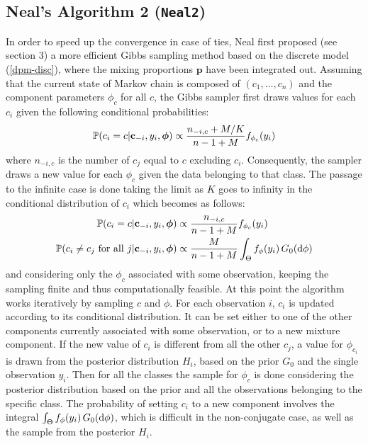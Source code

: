 \subsection{Neal's Algorithm 2 (\texttt{Neal2})}
In order to speed up the convergence in case of ties, Neal first proposed (see \cite{neal} section 3) a more efficient Gibbs sampling method based on the discrete model (\ref{dpm-disc}), where the mixing proportions $\textbf{p}$ have been integrated out.
Assuming that the current state of Markov chain is composed of $(c_1,\dots,c_n)$  and the component parameters $\phi_c$ for all $c$, the Gibbs sampler first draws values for each $c_i$ given the following conditional probabilities:
\begin{align}
			\mathbb P(c_{i}=c | \mathbf c_{-i}, y_{i},\boldsymbol\phi) \propto \frac{n_{-i,c} + M/{K}}{n-1+M} f_{\phi_{c}}(y_{i}) 
\end{align}
where $n_{-i,c}$ is the number of $c_j$ equal to $c$ excluding $c_i$.
Consequently, the sampler draws a new value for each $\phi_c$ given the data belonging to that class.
The passage to the infinite case is done taking the limit as $K$ goes to infinity in the conditional distribution of $c_i$ which becomes as follows:
\begin{align}
	\mathbb P(c_{i}=c | \mathbf c_{-i}, y_{i},\boldsymbol\phi) &\propto \frac{n_{-i,c} }{n-1+M} f_{\phi_{c}}(y_{i}) \\
	\mathbb P(c_{i}\neq c_{j} \text{ for all } j | \mathbf c_{-i}, y_{i},\boldsymbol\phi) &\propto \frac{M }{n-1+M} \int_{\Theta} f_{\phi}(y_{i}) \, G_0(\mathrm d\phi) \nonumber 
\end{align}
and considering only the $\phi_c$ associated with some observation, keeping the sampling finite and thus computationally feasible.
At this point the algorithm works iteratively by sampling $c$ and $\phi$.
For each observation $i$, $c_i$ is updated according to its conditional distribution.
It can be set either to one of the other components currently associated with some observation, or to a new mixture component.
If the new value of $c_i$ is different from all the other $c_j$, a value for $\phi_{c_i}$ is drawn from the posterior distribution $H_i$, based on the prior $G_0$ and the single observation $y_i$.
Then for all the classes the  sample for $\phi_c$ is done considering the posterior distribution based on the prior and all the observations belonging to the specific class.
The probability of setting $c_i$ to a new component involves the integral $\int_{\Theta} f_{\phi}(y_{i}) \, G_0(\mathrm d\phi)$, which is difficult in the non-conjugate case, as well as the sample from the posterior $H_i$.

